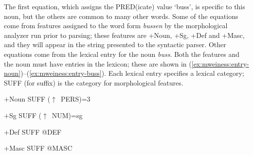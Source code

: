 \documentclass[output=paper]{langsci/langscibook}
\begin{document}
The first equation, which assigns the PRED(icate) value `buss', is specific to this noun, but the others are common to many other words.
Some of the equations come from features assigned to the word form \textit{bussen} by the morphological analyzer run prior to parsing; these features are +Noun, +Sg, +Def and +Masc, and they will appear in the string presented to the syntactic parser.
Other equations come from the lexical entry for the noun  \textit{buss}.
Both the features and the noun must have entries in the lexicon;  these are shown in (\ref{ex:mweiness:entry-noun})--(\ref{ex:mweiness:entry-buss}).
Each lexical entry specifies a lexical category; SUFF (for suffix) is the category for morphological features.

\ea\label{ex:mweiness:entry-noun}
{\small 
$+$Noun \hspace{0.4em} SUFF \hspace{0.4em} ($\uparrow$~PERS)=3
}
\z

\ea\label{ex:mweiness:entry-sg}
{\small 
$+$Sg \hspace{1.7em} SUFF \hspace{0.4em} ($\uparrow$~NUM)=sg
}
\z

\ea\label{ex:mweiness:entry-def}
{\small 
$+$Def  \hspace{1.2em} SUFF \hspace{0.4em} @DEF
}
\z

\ea\label{ex:mweiness:entry-masc}
{\small 
$+$Masc  \hspace{0.6em} SUFF \hspace{0.4em} @MASC
}
\z

\end{document}
